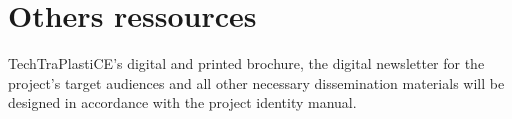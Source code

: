 \documentclass[
  12pt,
  oneside]{book}
\begin{document}




\section{Others ressources}\label{others-ressources}

TechTraPlastiCE's digital and printed brochure, the digital newsletter
for the project's target audiences and all other necessary dissemination
materials will be designed in accordance with the project identity
manual.


\backmatter
\end{document}
